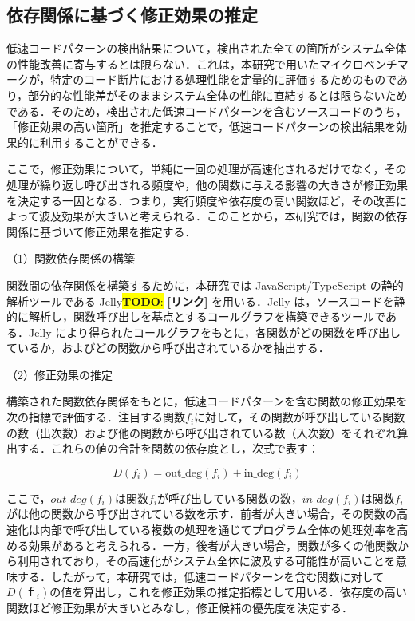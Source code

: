 \documentclass[submit,techrep,noauthor]{ipsj}
\newcommand{\todo}[1]{\colorbox{yellow}{{\bf TODO}:}{\color{red} {\textbf{[#1]}}}}
\begin{document}
\subsection{依存関係に基づく修正効果の推定}
低速コードパターンの検出結果について，検出された全ての箇所がシステム全体の性能改善に寄与するとは限らない．これは，本研究で用いたマイクロベンチマークが，特定のコード断片における処理性能を定量的に評価するためのものであり，部分的な性能差がそのままシステム全体の性能に直結するとは限らないためである．そのため，検出された低速コードパターンを含むソースコードのうち，「修正効果の高い箇所」を推定することで，低速コードパターンの検出結果を効果的に利用することができる．

ここで，修正効果について，単純に一回の処理が高速化されるだけでなく，その処理が繰り返し呼び出される頻度や，他の関数に与える影響の大きさが修正効果を決定する一因となる．つまり，実行頻度や依存度の高い関数ほど，その改善によって波及効果が大きいと考えられる．このことから，本研究では，関数の依存関係に基づいて修正効果を推定する．

（1）関数依存関係の構築

関数間の依存関係を構築するために，本研究では JavaScript/TypeScript の静的解析ツールである Jelly\todo{リンク} を用いる．Jelly は，ソースコードを静的に解析し，関数呼び出しを基点とするコールグラフを構築できるツールである．Jelly により得られたコールグラフをもとに，各関数がどの関数を呼び出しているか，およびどの関数から呼び出されているかを抽出する．

（2）修正効果の推定

構築された関数依存関係をもとに，低速コードパターンを含む関数の修正効果を次の指標で評価する．注目する関数$ f_i $に対して，その関数が呼び出している関数の数（出次数）および他の関数から呼び出されている数（入次数）をそれぞれ算出する．これらの値の合計を関数の依存度とし，次式で表す：

\begin{equation}
D(f_i) = \mathrm{out\_deg}(f_i) + \mathrm{in\_deg}(f_i)
\end{equation}

ここで，$ out\_deg(f_i) $は関数$ f_i $が呼び出している関数の数，$ in\_deg(f_i) $は関数$ f_i $がは他の関数から呼び出されている数を示す．前者が大きい場合，その関数の高速化は内部で呼び出している複数の処理を通じてプログラム全体の処理効率を高める効果があると考えられる．一方，後者が大きい場合，関数が多くの他関数から利用されており，その高速化がシステム全体に波及する可能性が高いことを意味する．したがって，本研究では，低速コードパターンを含む関数に対して$ D(ｆ_i) $の値を算出し，これを修正効果の推定指標として用いる．依存度の高い関数ほど修正効果が大きいとみなし，修正候補の優先度を決定する．
\end{document}

